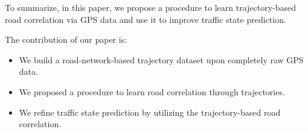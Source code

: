 To summarize, in this paper, we propose a procedure to learn trajectory-based road correlation via GPS data and use it to improve traffic state prediction.

The contribution of our paper is:
\begin{itemize}
    \item We build a road-network-based trajectory dataset upon completely raw GPS data.
    \item We proposed a procedure to learn road correlation through trajectories.
    \item We refine traffic state prediction by utilizing the trajectory-based road correlation.
\end{itemize}
